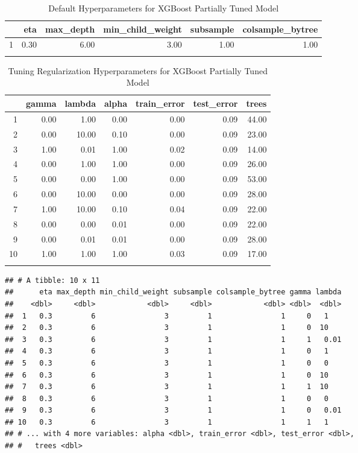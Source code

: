 \documentclass[11pt,preprint, authoryear]{elsarticle}
\numberwithin{equation}{section}
\numberwithin{figure}{section}
\numberwithin{table}{section}
\begin{document}
\begin{longtable}{rrrrrr}
  \hline
 & eta & max\_depth & min\_child\_weight & subsample & colsample\_bytree \\ 
  \hline
1 & 0.30 & 6.00 & 3.00 & 1.00 & 1.00 \\ 
   \hline
\hline
\caption{Default Hyperparameters for XGBoost Partially Tuned Model \label{XGBTune1Table}} 
\end{longtable}
\begin{longtable}{rrrrrrr}
  \hline
 & gamma & lambda & alpha & train\_error & test\_error & trees \\ 
  \hline
1 & 0.00 & 1.00 & 0.00 & 0.00 & 0.09 & 44.00 \\ 
  2 & 0.00 & 10.00 & 0.10 & 0.00 & 0.09 & 23.00 \\ 
  3 & 1.00 & 0.01 & 1.00 & 0.02 & 0.09 & 14.00 \\ 
  4 & 0.00 & 1.00 & 1.00 & 0.00 & 0.09 & 26.00 \\ 
  5 & 0.00 & 0.00 & 1.00 & 0.00 & 0.09 & 53.00 \\ 
  6 & 0.00 & 10.00 & 0.00 & 0.00 & 0.09 & 28.00 \\ 
  7 & 1.00 & 10.00 & 0.10 & 0.04 & 0.09 & 22.00 \\ 
  8 & 0.00 & 0.00 & 0.01 & 0.00 & 0.09 & 22.00 \\ 
  9 & 0.00 & 0.01 & 0.01 & 0.00 & 0.09 & 28.00 \\ 
  10 & 1.00 & 1.00 & 1.00 & 0.03 & 0.09 & 17.00 \\ 
   \hline
\hline
\caption{Tuning Regularization Hyperparameters for XGBoost Partially Tuned Model \label{XGBTune1Table_b}} 
\end{longtable}

\begin{verbatim}
## # A tibble: 10 x 11
##      eta max_depth min_child_weight subsample colsample_bytree gamma lambda
##    <dbl>     <dbl>            <dbl>     <dbl>            <dbl> <dbl>  <dbl>
##  1   0.3         6                3         1                1     0   1   
##  2   0.3         6                3         1                1     0  10   
##  3   0.3         6                3         1                1     1   0.01
##  4   0.3         6                3         1                1     0   1   
##  5   0.3         6                3         1                1     0   0   
##  6   0.3         6                3         1                1     0  10   
##  7   0.3         6                3         1                1     1  10   
##  8   0.3         6                3         1                1     0   0   
##  9   0.3         6                3         1                1     0   0.01
## 10   0.3         6                3         1                1     1   1   
## # ... with 4 more variables: alpha <dbl>, train_error <dbl>, test_error <dbl>,
## #   trees <dbl>
\end{verbatim}
\end{document}

